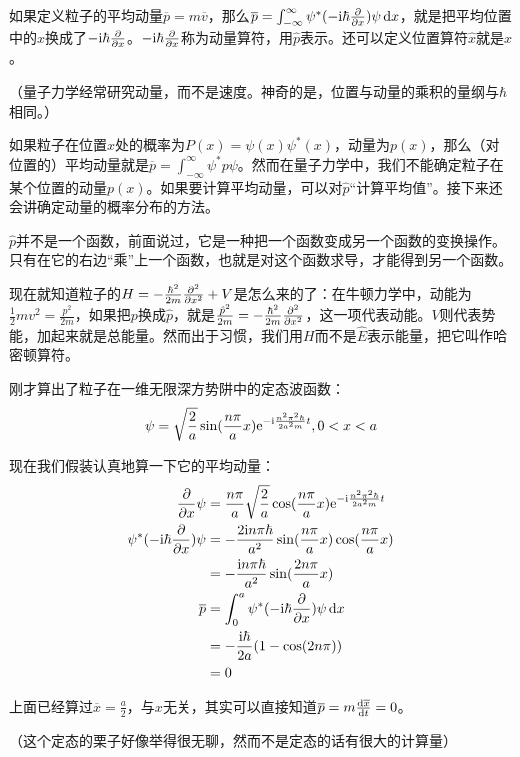 如果定义粒子的平均动量$\overline{p}=m \overline{v}$，那么$\overline{p}=\int_{-\infty}^{\infty} \psi^* (-\mathrm{i} \hbar \frac{\partial}{\partial x}) \psi \mathop{}\!\mathrm{d} x$，就是把平均位置中的$x$换成了$-\mathrm{i} \hbar \frac{\partial}{\partial x}$。$-\mathrm{i} \hbar \frac{\partial}{\partial x}$称为动量算符，用$\hat{p}$表示。还可以定义位置算符$\hat{x}$就是$x$。

（量子力学经常研究动量，而不是速度。神奇的是，位置与动量的乘积的量纲与$\hbar$相同。）

如果粒子在位置$x$处的概率为$P(x)=\psi(x) \psi^*(x)$，动量为$p(x)$，那么（对位置的）平均动量就是$\overline{p}=\int_{-\infty}^{\infty} \psi^* p \psi$。然而在量子力学中，我们不能确定粒子在某个位置的动量$p(x)$。如果要计算平均动量，可以对$\hat{p}$“计算平均值”。接下来还会讲确定动量的概率分布的方法。

$\hat{p}$并不是一个函数，前面说过，它是一种把一个函数变成另一个函数的变换操作。只有在它的右边“乘”上一个函数，也就是对这个函数求导，才能得到另一个函数。

现在就知道粒子的$H=-\frac{\hbar^2}{2 m} \frac{\partial^{2}}{\partial x^{2}}+V$是怎么来的了：在牛顿力学中，动能为$\frac{1}{2} m v^2=\frac{p^2}{2 m}$，如果把$p$换成$\hat{p}$，就是$\frac{\hat{p}^2}{2 m}=-\frac{\hbar^2}{2 m} \frac{\partial^{2}}{\partial x^{2}}$，这一项代表动能。$V$则代表势能，加起来就是总能量。然而出于习惯，我们用$H$而不是$\hat{E}$表示能量，把它叫作哈密顿算符。

刚才算出了粒子在一维无限深方势阱中的定态波函数：
\begin{equation*}
\psi=\sqrt{\frac{2}{a}} \sin(\frac{n \pi}{a} x) \mathrm{e}^{-\mathrm{i} \frac{n^2 \pi^2 \hbar}{2 a^2 m} t}, 0<x<a
\end{equation*}

现在我们假装认真地算一下它的平均动量：
\begin{align*}
\frac{\partial}{\partial x} \psi&=\frac{n \pi}{a} \sqrt{\frac{2}{a}} \cos(\frac{n \pi}{a} x) \mathrm{e}^{-\mathrm{i} \frac{n^2 \pi^2 \hbar}{2 a^2 m} t} \\
\psi^* (-\mathrm{i} \hbar \frac{\partial}{\partial x}) \psi&=-\frac{2 \mathrm{i} n \pi \hbar}{a^2} \sin(\frac{n \pi}{a} x) \cos(\frac{n \pi}{a} x) \\
&=-\frac{\mathrm{i} n \pi \hbar}{a^2} \sin(\frac{2 n \pi}{a} x) \\
\overline{p}&=\int_{0}^{a} \psi^* (-\mathrm{i} \hbar \frac{\partial}{\partial x}) \psi \mathop{}\!\mathrm{d} x \\
&=-\frac{\mathrm{i} \hbar}{2 a}(1-\cos(2 n \pi)) \\
&=0
\end{align*}

上面已经算过$\overline{x}=\frac{a}{2}$，与$x$无关，其实可以直接知道$\overline{p}=m \frac{\mathop{}\!\mathrm{d} \overline{x}}{\mathop{}\!\mathrm{d} t}=0$。

（这个定态的栗子好像举得很无聊，然而不是定态的话有很大的计算量）
